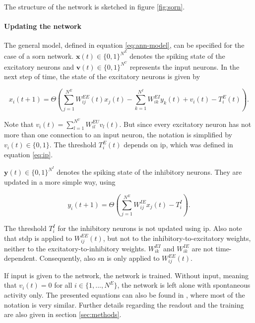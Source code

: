 The structure of the network is sketched in figure \ref{fig:sorn}.

\paragraph{Updating the network}

The general model, defined in equation \eqref{eq:ann-model}, can be specified for the  case of a \acs{sorn} network. $\bm x(t) \in \{0,1\}^{N^E}$ denotes the spiking state of the excitatory neurons and $\bm v(t) \in \{0,1\}^{N^U}$ represents the input neurons. In the next step of time, the state of the excitatory neurons is given by

\begin{equation}
\label{eq:update-excitatory}
x_i(t+1) = \Theta\left( \sum_{j=1}^{N^E} W_{ij}^{EE}(t) x_j(t) - \sum_{k=1}^{N^I} W_{ik}^{EI} y_k(t) + v_i(t) - T_i^E(t)\right).
\end{equation}

Note that $v_i(t) = \sum_{l=1}^{N^U} W_{il}^{EU} v_l(t)$. But since every excitatory neuron has not more than one connection to an input neuron, the notation is simplified by $v_i(t) \in \{0,1\}$. The threshold $T_i^E(t)$ depends on \acl{ip}, which was defined in equation \eqref{eq:ip}.


$\bm y(t) \in \{0,1\}^{N^I}$ denotes the spiking state of the inhibitory neurons. They are updated in a more simple way, using

\begin{equation}
\label{eq:update-inhibitory}
y_i(t+1) = \Theta\left( \sum_{j=1}^{N^E} W_{ij}^{IE} x_j(t) - T_i^I\right).
\end{equation}

The threshold $T_i^I$ for the inhibitory neurons is not updated using \acs{ip}. Also note that \acs{stdp} is applied to $W_{ij}^{EE}(t)$, but not to the inhibitory-to-excitatory weights, neither to the excitatory-to-inhibitory weights. $W_{ik}^{EI}$ and $W_{ik}^{IE}$ are not time-dependent. Consequently, also \acl{sn} is only applied to $W_{ij}^{EE}(t)$.

If input is given to the network, the network is trained. Without input, meaning that $v_i(t) = 0$ for all $i \in \{1, ..., N^E\}$, the network is left alone with spontaneous activity only. The presented equations can also be found in \textcite{lazar2009sorn}, where most of the notation is very similar. Further details regarding the readout and the training are also given in section \ref{sec:methods}.

